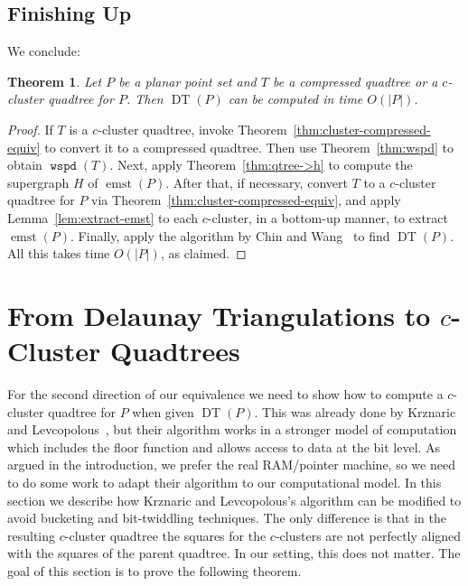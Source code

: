\documentclass[11pt]{paper}
\DeclareMathOperator {\wspd}{\texttt{wspd}}
\DeclareMathOperator {\emst}{emst}
\DeclareMathOperator {\DT}{DT}
\newtheorem {theorem} {Theorem}[section]
\begin{document}
\subsection{Finishing Up}
We conclude:
\begin {theorem} \label {thm:wspd->dt}
Let $P$ be a planar point set and $T$ be a compressed quadtree 
or a $c$-cluster quadtree 
for $P$.  Then $\DT(P)$ can be computed in time $O(|P|)$.
\end {theorem}

\begin{proof}
If $T$ is a $c$-cluster quadtree, invoke 
Theorem~\ref{thm:cluster-compressed-equiv} to convert it
to a compressed quadtree.
Then use Theorem~\ref{thm:wspd} to obtain $\wspd(T)$.
Next, apply Theorem~\ref{thm:qtree->h} to compute the
supergraph $H$ of $\emst(P)$. After that, if necessary, convert $T$ to a 
$c$-cluster quadtree for $P$ via Theorem~\ref{thm:cluster-compressed-equiv},
and apply Lemma~\ref{lem:extract-emst} to each $c$-cluster, in a bottom-up
manner, to extract $\emst(P)$. Finally, apply the algorithm
by Chin and Wang~\cite{ChinWa99} to find $\DT(P)$.
All this takes time $O(|P|)$, as claimed.
\end{proof}



















\section {From Delaunay Triangulations to $c$-Cluster Quadtrees}
\label {sec:dt->qt}


    For the second direction of our equivalence we need to show
    how to compute a $c$-cluster quadtree for $P$ when given
    $\DT(P)$. This was already done
    by Krznaric and Levcopolous~\cite{KrznaricLe95,KrznaricLe98},
    but their algorithm works in a stronger model of
    computation which includes the floor function and allows access to data
    at the bit level.
    As argued in the introduction, we prefer the real RAM/pointer machine,
    so we need to do some work to adapt their
    algorithm to our computational model.
    In this section we describe how Krznaric and Levcopolous's
    algorithm can be modified to avoid bucketing and bit-twiddling techniques.
    The only difference is that in the resulting $c$-cluster
    quadtree the squares for the $c$-clusters are not perfectly
    aligned with the squares of the parent quadtree. In our setting,
    this does not matter. The goal of this section is to prove the following
    theorem.
\end{document}
